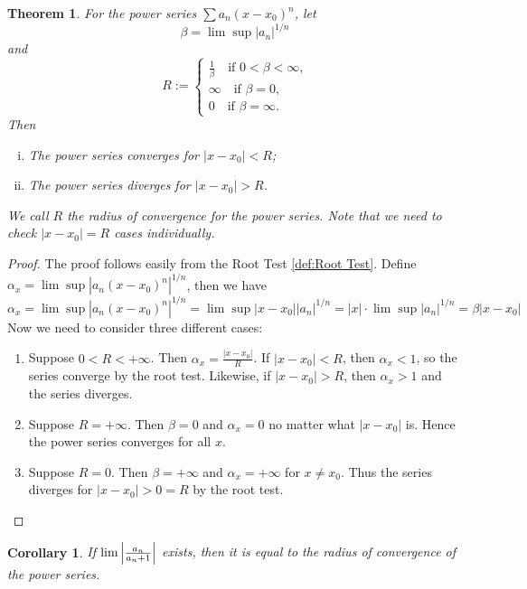 \documentclass[12pt, lettersize]{book}
\theoremstyle{plain}
\newtheorem{thm}{Theorem}[section]
\newtheorem{cor}{Corollary}[thm]
\theoremstyle{definition}
\theoremstyle{remark}
\begin{document}
			\begin{thm}\label{def:23.1}
			For the power series $\sum a_n(x-x_0)^n$, let
			\begin{displaymath}
				\beta=\lim\sup |a_n|^{1/n}
			\end{displaymath}
			and
			\begin{displaymath}
				R:=\begin{cases}
					\frac{1}{\beta}\quad\text{if $0<\beta<\infty$,}\\
					\infty\quad\text{if $\beta=0$,}\\
					0\quad\text{if $\beta=\infty$.}
				\end{cases}
			\end{displaymath} Then
			\begin{enumerate}[(i)]
				\item The power series converges for $|x-x_0|<R$;
				\item The power series diverges for $|x-x_0|>R$. 
			\end{enumerate}
			We call $R$ the \emph{radius of convergence} for the power series. Note that we need to check $|x-x_0|=R$ cases individually.
			\end{thm}
			\begin{proof}
			The proof follows easily from the Root Test \ref{def:Root Test}. Define $\alpha_x=\lim\sup|a_n(x-x_0)^n|^{1/n}$, then
			we have 
			\begin{displaymath}
				\alpha_x=\lim\sup|a_n(x-x_0)^n|^{1/n}=\lim\sup|x-x_0||a_n|^{1/n}=|x|\cdot\lim\sup|a_n|^{1/n}=\beta|x-x_0|
			\end{displaymath}
			Now we need to consider three different cases:
			\begin{enumerate}
				\item Suppose $0<R<+\infty$. Then $\alpha_x=\frac{|x-x_0|}{R}$. If $|x-x_0|<R$, then $\alpha_x<1$, so the series converge by the root test. Likewise, if $|x-x_0|>R$, then $\alpha_x>1$ and the series diverges.
				\item Suppose $R=+\infty$. Then $\beta=0$ and $\alpha_x=0$ no matter what $|x-x_0|$ is. Hence the power series converges for all $x$.
				\item Suppose $R=0$. Then $\beta=+\infty$ and $\alpha_x=+\infty$ for $x\neq x_0$. Thus the series diverges for $|x-x_0|>0=R$ by the root test.
			\end{enumerate}
			\end{proof}
			\begin{cor}
				If $\lim\abs{\frac{a_n}{a_n+1}}$ exists, then it is equal to the radius of convergence of the power series.
			\end{cor}
\end{document}
